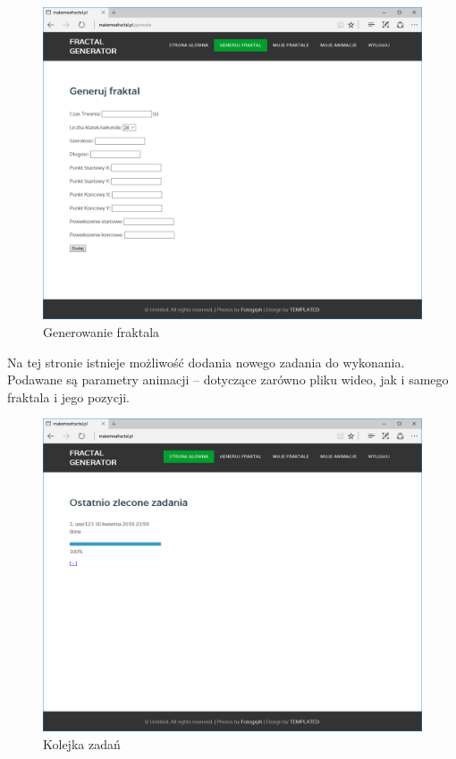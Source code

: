 \documentclass[a4paper]{article}
\begin{document}
\begin{figure}[H]
    \centering
    \includegraphics[width=\textwidth]{gen_page.png}
    \caption{Generowanie fraktala}
    \label{fig:gen_page}
\end{figure}
Na tej stronie istnieje możliwość dodania nowego zadania do wykonania. Podawane są parametry animacji -- dotyczące zarówno pliku wideo, jak i samego fraktala i jego pozycji.
\begin{figure}[H]
    \centering
    \includegraphics[width=\textwidth]{queue_page.png}
    \caption{Kolejka zadań}
    \label{fig:queue_page}
\end{figure}
\end{document}
